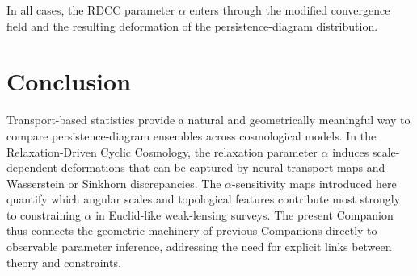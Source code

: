 \documentclass[11pt,a4paper]{article}
\begin{document}
In all cases, the RDCC parameter $\alpha$ enters through the modified convergence 
field and the resulting deformation of the persistence-diagram distribution.
\section{Conclusion}

Transport-based statistics provide a natural and geometrically meaningful way to 
compare persistence-diagram ensembles across cosmological models. In the 
Relaxation-Driven Cyclic Cosmology, the relaxation parameter $\alpha$ induces 
scale-dependent deformations that can be captured by neural transport maps and 
Wasserstein or Sinkhorn discrepancies. The $\alpha$-sensitivity maps introduced 
here quantify which angular scales and topological features contribute most 
strongly to constraining $\alpha$ in Euclid-like weak-lensing surveys. The present 
Companion thus connects the geometric machinery of previous Companions directly 
to observable parameter inference, addressing the need for explicit links between 
theory and constraints.


\nocite{*}

\end{document}

